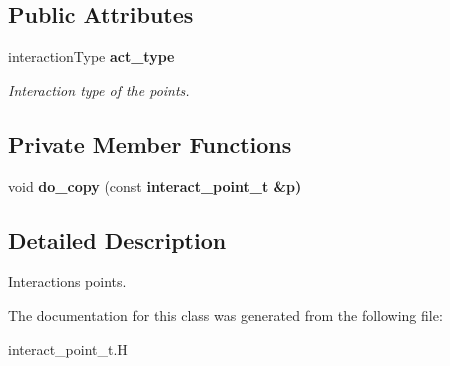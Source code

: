 \subsection*{Public Attributes}
\begin{CompactItemize}
\item 
interaction\-Type \bf{act\_\-type}\label{classASCbase_1_1interact__point__t_63eee3d009abf146282a6a8bf73bbaec}

\begin{CompactList}\small\item\em Interaction type of the points. \item\end{CompactList}\end{CompactItemize}
\subsection*{Private Member Functions}
\begin{CompactItemize}
\item 
void \textbf{do\_\-copy} (const \bf{interact\_\-point\_\-t} \&p)\label{classASCbase_1_1interact__point__t_01ba09e2cc58d89156b62a2398e24de1}

\end{CompactItemize}


\subsection{Detailed Description}
Interactions points. 



The documentation for this class was generated from the following file:\begin{CompactItemize}
\item 
interact\_\-point\_\-t.H\end{CompactItemize}
